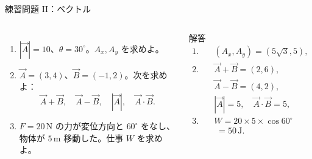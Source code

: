 \documentclass[notheorems,aspectratio=169]{beamer}
\begin{document}
\begin{frame}{練習問題 II：ベクトル}
  \small
  \begin{columns}[T,onlytextwidth]
    \begin{enumerate}
      \item $|\vec A|=10$、$\theta=30^\circ$。$A_x,A_y$ を求めよ。
      \item $\vec A=(3,4)$、$\vec B=(-1,2)$。次を求めよ：
        \[
          \vec A+\vec B,\quad \vec A-\vec B,\quad
          |\vec A|,\quad \vec A\cdot\vec B.
        \]
      \item $F=20\,\mathrm{N}$ の力が変位方向と $60^\circ$ をなし、物体が $5\,\mathrm{m}$ 移動した。仕事 $W$ を求めよ。
    \end{enumerate}

    \begin{alertblock}{解答}
      \begin{align*}
        1.&\quad (A_x,A_y)=(5\sqrt3,5),\\
        2.&\quad \vec A+\vec B=(2,6),\\
          &\quad \vec A-\vec B=(4,2),\\
          &\quad |\vec A|=5,\quad \vec A\cdot\vec B=5,\\
        3.&\quad W=20\times5\times\cos60^\circ\\
          &\quad\;=50\,\mathrm{J}.
      \end{align*}
    \end{alertblock}
  \end{columns}
\end{frame}
\end{document}
